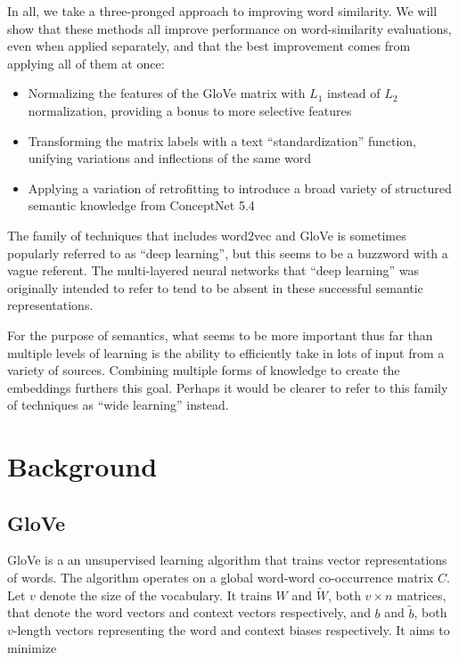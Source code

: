 \documentclass[letterpaper]{article}
\begin{document}
In all, we take a three-pronged approach to improving word similarity. We will
show that these methods all improve performance on word-similarity evaluations,
even when applied separately, and that the best improvement comes from applying
all of them at once:

\begin{itemize}
\item Normalizing the features of the GloVe matrix with $L_1$ instead of $L_2$
    normalization, providing a bonus to more selective features
\item Transforming the matrix labels with a text ``standardization'' function,
    unifying variations and inflections of the same word
\item Applying a variation of retrofitting to introduce a broad variety of
    structured semantic knowledge from ConceptNet 5.4
\end{itemize}

The family of techniques that includes word2vec and GloVe is sometimes popularly
referred to as ``deep learning'', but this seems to be a buzzword with a vague
referent. The multi-layered neural networks that ``deep learning'' was
originally intended to refer to \cite{hinton2006deep} tend to be absent in these
successful semantic representations.

For the purpose of semantics, what seems to be more important thus far than
multiple levels of learning is the ability to efficiently take in lots of input
from a variety of sources. Combining multiple forms of knowledge to create the
embeddings furthers this goal. Perhaps it would be clearer to refer to this
family of techniques as ``wide learning'' instead.

\section{Background}

\subsection{GloVe}

GloVe \cite{pennington2014glove} is a an unsupervised learning algorithm that
trains vector representations of words. The algorithm operates on a global
word-word co-occurrence matrix $C$. Let $v$ denote the size of the vocabulary.
It trains $W$ and $\tilde{W}$, both $v \times n$ matrices, that
denote the word vectors and context vectors respectively, and $b$ and
$\tilde{b}$, both $v$-length vectors representing the word and context biases
respectively. It aims to minimize
\end{document}
